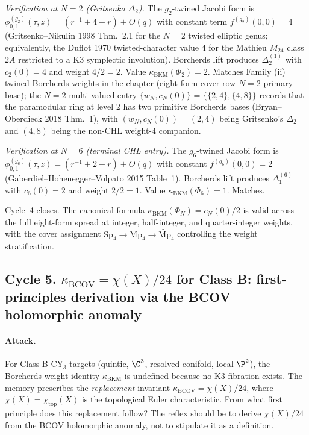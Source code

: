 \emph{Verification at $N = 2$ (Gritsenko $\Delta_2$).} The
$g_2$-twined Jacobi form is $\phi_{0, 1}^{(g_2)}(\tau, z) =
(r^{-1} + 4 + r) + O(q)$ with constant term $f^{(g_2)}(0, 0) = 4$
(Gritsenko--Nikulin 1998 Thm.~2.1 for the $N = 2$ twisted elliptic
genus; equivalently, the Duflot 1970 twisted-character value $4$
for the Mathieu $M_{24}$ class $2A$ restricted to a K3 symplectic
involution). Borcherds lift produces $\Delta_2^{(1)}$ with
$c_2(0) = 4$ and weight $4/2 = 2$. Value
$\kappa_{\mathrm{BKM}}(\Phi_2) = 2$. Matches Family (ii) twined
Borcherds weights in the chapter (eight-form-cover row $N = 2$
primary base); the $N = 2$ multi-valued entry $\{w_N, c_N(0)\}$
= $\{\{2, 4\}, \{4, 8\}\}$ records that the paramodular ring at
level $2$ has two primitive Borcherds bases (Bryan--Oberdieck 2018
Thm.~1), with $(w_N, c_N(0)) = (2, 4)$ being Gritsenko's
$\Delta_2$ and $(4, 8)$ being the non-CHL weight-$4$ companion.

\emph{Verification at $N = 6$ (terminal CHL entry).} The
$g_6$-twined Jacobi form is $\phi_{0, 1}^{(g_6)}(\tau, z) =
(r^{-1} + 2 + r) + O(q)$ with constant $f^{(g_6)}(0, 0) = 2$
(Gaberdiel--Hohenegger--Volpato 2015 Table~1). Borcherds lift
produces $\Delta_1^{(6)}$ with $c_6(0) = 2$ and weight $2/2 = 1$.
Value $\kappa_{\mathrm{BKM}}(\Phi_6) = 1$. Matches.

Cycle~4 closes. The canonical formula $\kappa_{\mathrm{BKM}}
(\Phi_N) = c_N(0)/2$ is valid across the full eight-form spread
at integer, half-integer, and quarter-integer weights, with the
cover assignment $\mathrm{Sp}_4 \to \mathrm{Mp}_4 \to
\widetilde{\mathrm{Mp}}_4$ controlling the weight stratification.

\subsection*{Cycle 5. $\kappa_{\mathrm{BCOV}} = \chi(X)/24$ for
  Class B: first-principles derivation via the BCOV holomorphic
  anomaly}

\paragraph{Attack.} For Class B CY$_3$ targets (quintic, $\C^3$,
resolved conifold, local $\P^2$), the Borcherds-weight identity
$\kappa_{\mathrm{BKM}}$ is undefined because no K3-fibration exists.
The memory prescribes the \emph{replacement} invariant
$\kappa_{\mathrm{BCOV}} = \chi(X)/24$, where $\chi(X) =
\chi_{\mathrm{top}}(X)$ is the topological Euler characteristic.
From what first principle does this replacement follow? The
reflex should be to derive $\chi(X)/24$ from the BCOV holomorphic
anomaly, not to stipulate it as a definition.

